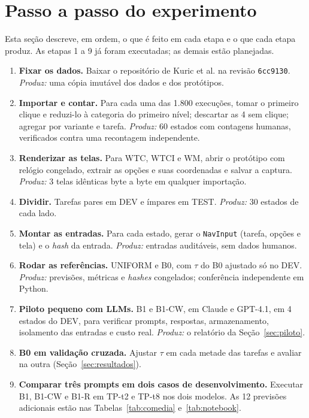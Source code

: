 \documentclass[12pt]{article}
\newcommand{\code}[1]{\texttt{#1}}
\begin{document}
\section{Passo a passo do experimento}
\label{sec:passos}

Esta seção descreve, em ordem, o que é feito em cada etapa e o que cada etapa produz. As etapas 1 a 9 já foram executadas; as demais estão planejadas.

\begin{enumerate}[leftmargin=*,label=\textbf{Passo \arabic*.},itemsep=3pt]
\item \textbf{Fixar os dados.} Baixar o repositório de Kuric et al. \cite{kuric2025dataset} na revisão \code{6cc9130}. \emph{Produz:} uma cópia imutável dos dados e dos protótipos.
\item \textbf{Importar e contar.} Para cada uma das 1.800 execuções, tomar o primeiro clique e reduzi-lo à categoria do primeiro nível; descartar as 4 sem clique; agregar por variante e tarefa. \emph{Produz:} 60 estados com contagens humanas, verificados contra uma recontagem independente.
\item \textbf{Renderizar as telas.} Para WTC, WTCI e WM, abrir o protótipo com relógio congelado, extrair as opções e suas coordenadas e salvar a captura. \emph{Produz:} 3 telas idênticas byte a byte em qualquer importação.
\item \textbf{Dividir.} Tarefas pares em DEV e ímpares em TEST. \emph{Produz:} 30 estados de cada lado.
\item \textbf{Montar as entradas.} Para cada estado, gerar o \code{NavInput} (tarefa, opções e tela) e o \textit{hash} da entrada. \emph{Produz:} entradas auditáveis, sem dados humanos.
\item \textbf{Rodar as referências.} UNIFORM e B0, com $\tau$ do B0 ajustado só no DEV. \emph{Produz:} previsões, métricas e \textit{hashes} congelados; conferência independente em Python.
\item \textbf{Piloto pequeno com LLMs.} B1 e B1-CW, em Claude e GPT-4.1, em 4 estados do DEV, para verificar prompts, respostas, armazenamento, isolamento das entradas e custo real. \emph{Produz:} o relatório da Seção~\ref{sec:piloto}.
\item \textbf{B0 em validação cruzada.} Ajustar $\tau$ em cada metade das tarefas e avaliar na outra (Seção~\ref{sec:resultados}).
\item \textbf{Comparar três prompts em dois casos de desenvolvimento.} Executar B1, B1-CW e B1-R em TP-t2 e TP-t8 nos dois modelos. As 12 previsões adicionais estão nas Tabelas~\ref{tab:comedia} e~\ref{tab:notebook}.

\end{enumerate}
\end{document}
